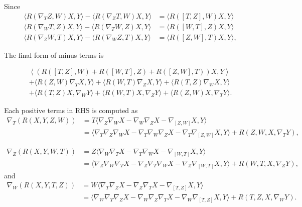 \documentclass[a4paper, 12pt]{article}
\theoremstyle{Mydefinition}
\theoremstyle{Mytheorem}
\begin{document}
Since
\begin{equation}
    \begin{split}
         \langle R(\nabla_T Z, W)X, Y\rangle - \langle R(\nabla_Z T, W) X, Y\rangle &=\langle R([T,Z],W)X,Y\rangle\\
         \langle R(\nabla_W T,  Z)X, Y\rangle -\langle R(\nabla_T W, Z) X, Y\rangle &= \langle R([W,T],Z)X, Y\rangle\\
         \langle R(\nabla_Z W,  T)X, Y\rangle - \langle R(\nabla_W Z, T) X, Y\rangle &= \langle R([Z,W],T)X,Y\rangle,
    \end{split}
\end{equation}

The final form of minus terms is

\begin{multline}\label{Eq_3_1}
    \left\langle \left(R([T,Z],W)+R([W,T],Z)+R([Z,W],T)\right)X,Y\right\rangle \\
    +\langle R(Z, W)\nabla_T X, Y\rangle  + \langle R(W, T)\nabla_Z X, Y\rangle  + \langle R(T, Z)\nabla_W X, Y\rangle \\
    + \langle R(T,Z)X, \nabla_W Y\rangle  + \langle R(W,T)X, \nabla_Z Y\rangle  + \langle R(Z,W)X, \nabla_T  Y\rangle.
\end{multline}

Each positive terms in RHS is computed as
\begin{equation}
    \begin{split}
    \nabla_T (R(X,Y,Z,W)) &= T\langle\nabla_Z\nabla_W X - \nabla_W\nabla_Z X - \nabla_{[Z,W]}X, Y\rangle \\
    &= \langle \nabla_T\nabla_Z\nabla_W X - \nabla_T\nabla_W\nabla_Z X - \nabla_T\nabla_{[Z,W]}X, Y\rangle + R(Z, W, X,\nabla_T Y),
    \end{split}
\end{equation}

\begin{equation}
    \begin{split}
    \nabla_Z (R(X,Y,W,T)) &= Z\langle\nabla_W\nabla_T X - \nabla_T\nabla_W X - \nabla_{[W,T]}X, Y\rangle \\
    &= \langle \nabla_Z\nabla_W\nabla_T X - \nabla_Z\nabla_T\nabla_W X - \nabla_Z\nabla_{[W,T]}X, Y\rangle + R(W, T, X,\nabla_Z Y),
    \end{split}
\end{equation}
and
\begin{equation}
    \begin{split}
    \nabla_W (R(X,Y,T,Z)) &= W\langle\nabla_T\nabla_Z X - \nabla_Z\nabla_T X - \nabla_{[T,Z]}X, Y\rangle \\
    &= \langle \nabla_W\nabla_T\nabla_Z X - \nabla_W\nabla_Z\nabla_T X - \nabla_W\nabla_{[T,Z]}X, Y\rangle + R(T, Z, X,\nabla_W Y).
    \end{split}
\end{equation}
\end{document}
